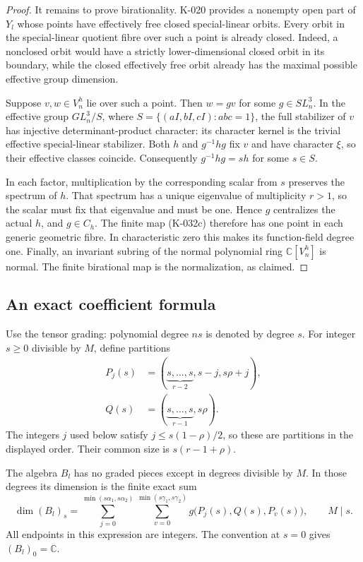 \begin{proof}
It remains to prove birationality.  K-020 provides a nonempty open
part of $Y_l$ whose points have effectively free closed special-linear
orbits.  Every orbit in the special-linear quotient fibre over such
a point is already closed.  Indeed, a nonclosed orbit would have a
strictly lower-dimensional closed orbit in its boundary, while the
closed effectively free orbit already has the maximal possible
effective group dimension.

Suppose $v,w\in V_n^h$ lie over such a point.  Then $w=g v$ for some
$g\in SL_n^3$.  In the effective group $GL_n^3/S$, where
$S=\{(aI,bI,cI):abc=1\}$, the full stabilizer of $v$ has injective
determinant-product character: its character kernel is the trivial
effective special-linear stabilizer.  Both $h$ and $g^{-1}hg$ fix $v$
and have character $\xi$, so their effective classes coincide.
Consequently $g^{-1}hg=s h$ for some $s\in S$.

In each factor, multiplication by the corresponding scalar from $s$
preserves the spectrum of $h$.  That spectrum has a unique eigenvalue
of multiplicity $r>1$, so the scalar must fix that eigenvalue and
must be one.  Hence $g$ centralizes the actual $h$, and $g\in C_h$.
The finite map (K-032c) therefore has one point in each generic
geometric fibre.  In characteristic zero this makes its function-field
degree one.  Finally, an invariant subring of the normal polynomial
ring $\mathbb C[V_n^h]$ is normal.  The finite birational map is the
normalization, as claimed.
\end{proof}

\subsection*{An exact coefficient formula}

Use the tensor grading: polynomial degree $ns$ is denoted by degree
$s$.  For integer $s\ge0$ divisible by $M$, define partitions
\[
 \begin{split}
 P_j(s)&=(\underbrace{s,\ldots,s}_{r-2},s-j,s\rho+j),\\
 Q(s)&=(\underbrace{s,\ldots,s}_{r-1},s\rho).
 \end{split}                                             \tag{K-032e}
\]
The integers $j$ used below satisfy $j\le s(1-\rho)/2$, so these
are partitions in the displayed order.  Their common size is
$s(r-1+\rho)$.

\begin{theorem}
The algebra $B_l$ has no graded pieces except in degrees divisible
by $M$.  In those degrees its dimension is the finite exact sum
\[
 \dim (B_l)_s=
 \sum_{j=0}^{\min(s\alpha_1,s\alpha_2)}
 \sum_{v=0}^{\min(s\gamma_1,s\gamma_2)}
          g\bigl(P_j(s),Q(s),P_v(s)\bigr),\qquad M\mid s.
                                                        \tag{K-032f}
\]
All endpoints in this expression are integers.  The convention at
$s=0$ gives $(B_l)_0=\mathbb C$.
\end{theorem}


